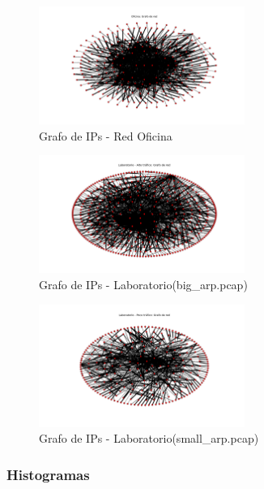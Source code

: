 \begin{figure}[H]
  \centering
    \includegraphics[width=0.6\textwidth]{graficos/grafoOficina.png}
    \caption{Grafo de IPs - Red Oficina}
    \label{fig:grafo1}
\end{figure}

\begin{figure}[H]
  \centering
    \includegraphics[width=0.6\textwidth]{graficos/grafoLaboBig.png}
    \caption{Grafo de IPs - Laboratorio(big\_arp.pcap)}
    \label{fig:grafo1}
\end{figure}

\begin{figure}[H]
  \centering
    \includegraphics[width=0.6\textwidth]{graficos/grafoLaboSmall.png}
    \caption{Grafo de IPs - Laboratorio(small\_arp.pcap)}
    \label{fig:grafo1}
\end{figure}

\subsubsection{Histogramas}

